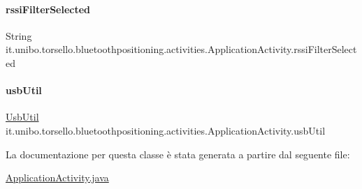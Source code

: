 \paragraph{\texorpdfstring{rssi\+Filter\+Selected}{rssiFilterSelected}}
{\footnotesize\ttfamily String it.\+unibo.\+torsello.\+bluetoothpositioning.\+activities.\+Application\+Activity.\+rssi\+Filter\+Selected\hspace{0.3cm}{\ttfamily [private]}}

\hypertarget{classit_1_1unibo_1_1torsello_1_1bluetoothpositioning_1_1activities_1_1ApplicationActivity_abe62157d98c81406ae3d79dbc0fd9093_abe62157d98c81406ae3d79dbc0fd9093}{}\label{classit_1_1unibo_1_1torsello_1_1bluetoothpositioning_1_1activities_1_1ApplicationActivity_abe62157d98c81406ae3d79dbc0fd9093_abe62157d98c81406ae3d79dbc0fd9093} 
\paragraph{\texorpdfstring{usb\+Util}{usbUtil}}
{\footnotesize\ttfamily \hyperlink{classit_1_1unibo_1_1torsello_1_1bluetoothpositioning_1_1util_1_1UsbUtil}{Usb\+Util} it.\+unibo.\+torsello.\+bluetoothpositioning.\+activities.\+Application\+Activity.\+usb\+Util\hspace{0.3cm}{\ttfamily [private]}}



La documentazione per questa classe è stata generata a partire dal seguente file\+:\begin{DoxyCompactItemize}
\item 
\hyperlink{ApplicationActivity_8java}{Application\+Activity.\+java}\end{DoxyCompactItemize}

